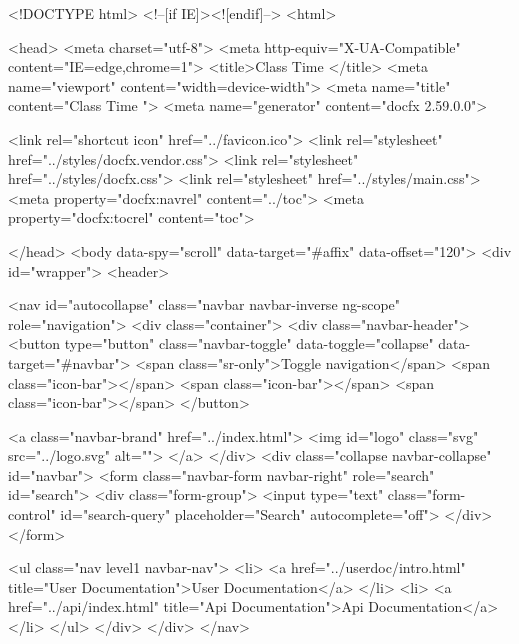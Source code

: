 ﻿<!DOCTYPE html>
<!--[if IE]><![endif]-->
<html>
  
  <head>
    <meta charset="utf-8">
    <meta http-equiv="X-UA-Compatible" content="IE=edge,chrome=1">
    <title>Class Time
   </title>
    <meta name="viewport" content="width=device-width">
    <meta name="title" content="Class Time
   ">
    <meta name="generator" content="docfx 2.59.0.0">
    
    <link rel="shortcut icon" href="../favicon.ico">
    <link rel="stylesheet" href="../styles/docfx.vendor.css">
    <link rel="stylesheet" href="../styles/docfx.css">
    <link rel="stylesheet" href="../styles/main.css">
    <meta property="docfx:navrel" content="../toc">
    <meta property="docfx:tocrel" content="toc">
    
    
    
  </head>  <body data-spy="scroll" data-target="#affix" data-offset="120">
    <div id="wrapper">
      <header>
        
        <nav id="autocollapse" class="navbar navbar-inverse ng-scope" role="navigation">
          <div class="container">
            <div class="navbar-header">
              <button type="button" class="navbar-toggle" data-toggle="collapse" data-target="#navbar">
                <span class="sr-only">Toggle navigation</span>
                <span class="icon-bar"></span>
                <span class="icon-bar"></span>
                <span class="icon-bar"></span>
              </button>
              
              <a class="navbar-brand" href="../index.html">
                <img id="logo" class="svg" src="../logo.svg" alt="">
              </a>
            </div>
            <div class="collapse navbar-collapse" id="navbar">
              <form class="navbar-form navbar-right" role="search" id="search">
                <div class="form-group">
                  <input type="text" class="form-control" id="search-query" placeholder="Search" autocomplete="off">
                </div>
              </form>
                
                <ul class="nav level1 navbar-nav">
                      <li>
                          <a href="../userdoc/intro.html" title="User Documentation">User Documentation</a>
                      </li>
                      <li>
                          <a href="../api/index.html" title="Api Documentation">Api Documentation</a>
                      </li>
                </ul>    </div>
          </div>
        </nav>
        

